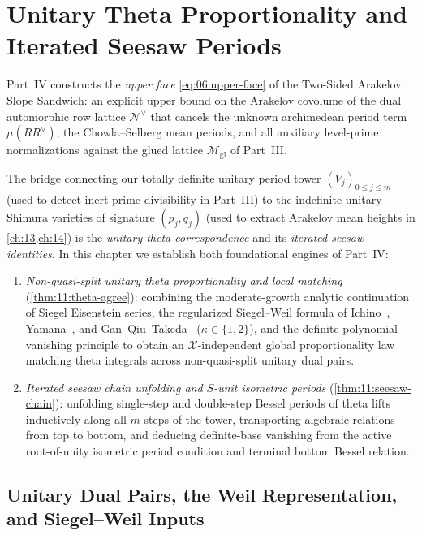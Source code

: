 \chapter{Unitary Theta Proportionality and Iterated Seesaw Periods}
\label{ch:11}

Part~IV constructs the \emph{upper face} \eqref{eq:06:upper-face} of the Two-Sided Arakelov Slope Sandwich: an explicit upper bound on the Arakelov covolume of the dual automorphic row lattice $\mathcal{N}^\vee$ that cancels the unknown archimedean period term $\mu(RR^\vee)$, the Chowla--Selberg mean periods, and all auxiliary level-prime normalizations against the glued lattice $\mathcal{M}_{\mathrm{gl}}$ of Part~III.

The bridge connecting our totally definite unitary period tower $(V_j)_{0 \le j \le m}$ (used to detect inert-prime divisibility in Part~III) to the indefinite unitary Shimura varieties of signature $(p_j, q_j)$ (used to extract Arakelov mean heights in \cref{ch:13,ch:14}) is the \emph{unitary theta correspondence} and its \emph{iterated seesaw identities}. In this chapter we establish both foundational engines of Part~IV:
\begin{enumerate}[label=(\roman*)]
\item \emph{Non-quasi-split unitary theta proportionality and local matching} (\cref{thm:11:theta-agree}): combining the moderate-growth analytic continuation of Siegel Eisenstein series, the regularized Siegel--Weil formula of Ichino~\cite{Ichino2004,Ichino2007}, Yamana~\cite{Yamana2013}, and Gan--Qiu--Takeda~\cite{GanQiuTakeda2014} ($\kappa \in \{1, 2\}$), and the definite polynomial vanishing principle to obtain an $\mathcal{X}$-independent global proportionality law matching theta integrals across non-quasi-split unitary dual pairs.
\item \emph{Iterated seesaw chain unfolding and $S$-unit isometric periods} (\cref{thm:11:seesaw-chain}): unfolding single-step and double-step Bessel periods of theta lifts inductively along all $m$ steps of the tower, transporting algebraic relations from top to bottom, and deducing definite-base vanishing from the active root-of-unity isometric period condition and terminal bottom Bessel relation.
\end{enumerate}

\section{Unitary Dual Pairs, the Weil Representation, and Siegel--Weil Inputs}
\label{sec:11:weil-siegel-weil}

